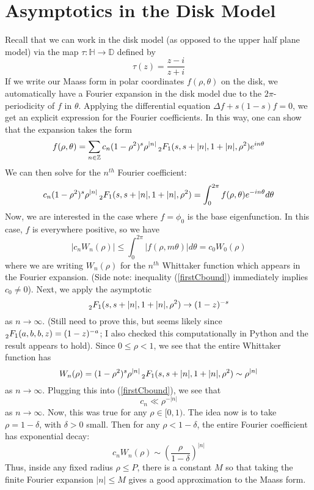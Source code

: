 \documentclass[]{article}
\begin{document}
\section*{Asymptotics in the Disk Model}

Recall that we can work in the disk model (as opposed to the upper half plane model) via the map $\tau : \mathbb{H} \rightarrow \mathbb{D}$ defined by
$$
\tau(z) = \frac{z - i}{z + i}
$$
If we write our Maass form in polar coordinates $f(\rho, \theta)$ on the disk, we automatically have a Fourier expansion in the disk model due to the $2\pi$-periodicity of $f$ in $\theta$.
Applying the differential equation $\Delta f + s(1-s)f = 0$, we get an explicit expression for the Fourier coefficients.
In this way, one can show that the expansion takes the form
$$
f(\rho, \theta) = \sum_{n \in \mathbb{Z}}c_n(1 - \rho^2)^s\rho^{|n|}\prescript{}{2}{F_1}(s, s + |n|, 1 + |n|, \rho^2)e^{in\theta}
$$
We can then solve for the $n^{th}$ Fourier coefficient:
$$
c_n(1 - \rho^2)^s\rho^{|n|}\prescript{}{2}{F_1}(s, s + |n|, 1 + |n|, \rho^2) =
\int_{0}^{2\pi}f(\rho, \theta)e^{-in\theta}d\theta
$$
Now, we are interested in the case where $f = \phi_0$ is the base eigenfunction.
In this case, $f$ is everywhere positive, so we have
\begin{equation}\label{firstCbound}
|c_nW_n(\rho)| \leq \int_{0}^{2\pi}|f(\rho,m \theta)|d\theta = c_0W_0(\rho)
\end{equation}
where we are writing $W_n(\rho)$ for the $n^{th}$ Whittaker function which appears in the Fourier expansion.
(Side note: inequality (\ref{firstCbound}) immediately implies $c_0 \neq 0$).
Next, we apply the asymptotic
$$
\prescript{}{2}{F_1}(s, s + |n|, 1 + |n|, \rho^2) \rightarrow (1 - z)^{-s}
$$
as $n \rightarrow \infty$. (Still need to prove this, but seems likely since $\prescript{}{2}{F_1}(a, b, b, z) = (1 - z)^{-a}$; I also checked this computationally in Python and the result appears to hold).
Since $0 \leq \rho < 1$, we see that the entire Whittaker function has
$$
W_n(\rho) = (1 - \rho^2)^s\rho^{|n|}\prescript{}{2}{F_1}(s, s + |n|, 1 + |n|, \rho^2) \sim \rho^{|n|}
$$
as $n \rightarrow \infty$.
Plugging this into (\ref{firstCbound}), we see that
$$
c_n \ll \rho^{-|n|}
$$
as $n \rightarrow \infty$.
Now, this was true for any $\rho \in [0, 1)$.
The idea now is to take $\rho = 1 - \delta$, with $\delta > 0$ small.
Then for any $\rho < 1 - \delta$, the entire Fourier coefficient has exponential decay:
$$
c_nW_n(\rho) \sim \left( \frac{\rho}{1 - \delta} \right)^{|n|}
$$
Thus, inside any fixed radius $\rho \leq P$, there is a constant $M$ so that taking the finite Fourier expansion $|n| \leq M$ gives a good approximation to the Maass form.
\end{document}
